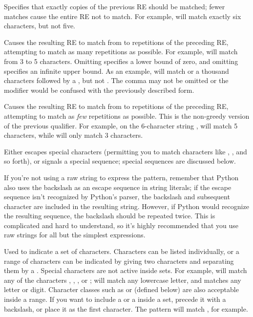 \begin{list}{}{\leftmargin 0.7in }
\item[\code{\{\var{m}\}}]
Specifies that exactly  copies of the previous RE should be
matched; fewer matches cause the entire RE not to match.  For example,
 will match exactly six  characters, but
not five.

\item[\code{\{\var{m},\var{n}\}}] Causes the resulting RE to match from
 to  repetitions of the preceding RE, attempting to
match as many repetitions as possible.  For example, 
will match from 3 to 5  characters.  Omitting 
specifies a lower bound of zero, 
and omitting  specifies an infinite upper bound.  As an
example,  will match  or a thousand
 characters followed by a , but not .
The comma may not be omitted or the modifier would be confused with
the previously described form.

\item[\code{\{\var{m},\var{n}\}?}] Causes the resulting RE to
match from  to  repetitions of the preceding RE,
attempting to match as \emph{few} repetitions as possible.  This is
the non-greedy version of the previous qualifier.  For example, on the
6-character string ,  will match 5
 characters, while  will only match 3
characters.

\item[\character{\e}] Either escapes special characters (permitting
you to match characters like \character{*}, , and so
forth), or signals a special sequence; special sequences are discussed
below.

If you're not using a raw string to
express the pattern, remember that Python also uses the
backslash as an escape sequence in string literals; if the escape
sequence isn't recognized by Python's parser, the backslash and
subsequent character are included in the resulting string.  However,
if Python would recognize the resulting sequence, the backslash should
be repeated twice.  This is complicated and hard to understand, so
it's highly recommended that you use raw strings for all but the
simplest expressions.

\item[\code{[]}] Used to indicate a set of characters.  Characters can
be listed individually, or a range of characters can be indicated by
giving two characters and separating them by a \character{-}.  Special
characters are not active inside sets.  For example, \regexp{[akm\$]}
will match any of the characters , ,
, or \character{\$}; \regexp{[a-z]}
will match any lowercase letter, and \code{[a-zA-Z0-9]} matches any
letter or digit.  Character classes such as  or 
(defined below) are also acceptable inside a range.  If you want to
include a \character{]} or a \character{-} inside a set, precede it with a
backslash, or place it as the first character.  The
pattern \regexp{[]]} will match \code{']'}, for example.


\end{list}
